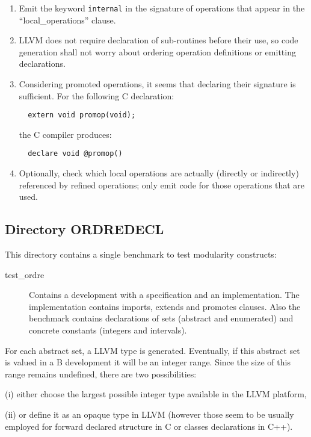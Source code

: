 \documentclass{article}
\begin{document}
\begin{enumerate}
\item Emit the keyword \texttt{internal} in the signature of
  operations that appear in the ``local\_operations'' clause.
\item LLVM does not require declaration of sub-routines before their
  use, so code generation shall not worry about ordering operation
  definitions or emitting declarations.
\item Considering promoted operations, it seems that declaring their
  signature is sufficient. For the following C declaration:
\begin{verbatim}
  extern void promop(void);
\end{verbatim}
  the C compiler produces:
\begin{verbatim}
  declare void @promop()
\end{verbatim}
\item Optionally, check which local operations are actually (directly
  or indirectly) referenced by refined operations; only emit code for
  those operations that are used.
\end{enumerate}

\subsection{Directory ORDREDECL}

This directory contains a single benchmark to test modularity constructs:
\begin{description}
\item[test\_ordre] Contains a development with a specification and an
  implementation. The implementation contains imports, extends and
  promotes clauses. Also the benchmark contains declarations of sets
  (abstract and enumerated) and concrete constants (integers and
  intervals).
\end{description}

For each abstract set, a LLVM type is generated. Eventually, if this
abstract set is valued in a B development it will be an integer range.
Since the size of this range remains undefined, there are two
possibilities: 

(i) either choose the largest possible integer type available
in the LLVM platform, 

(ii) or define it as an opaque type in LLVM (however those seem to be
usually employed for forward declared structure in C or classes
declarations in C++).
\end{document}
